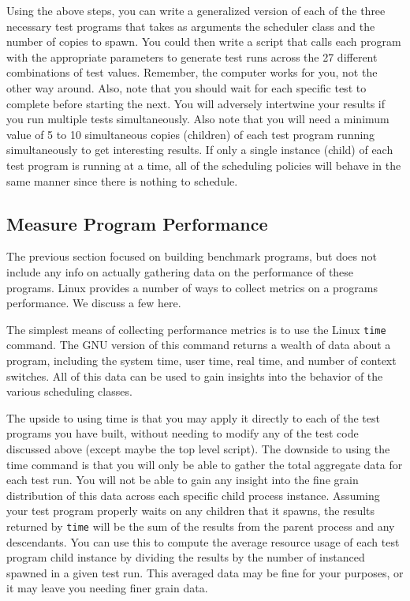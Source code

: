 \documentclass[12pt]{article}
\begin{document}
Using the above steps, you can write a generalized version of each
of the three necessary test programs that takes as arguments the
scheduler class and
the number of copies to spawn.
You could then write a script that calls each program with the
appropriate parameters to generate test runs
across the 27 different combinations of test values. Remember, the
computer works for you, not the other way around. Also, note that you
should wait for each specific test to complete before
starting the next. You will adversely intertwine your results if you
run multiple tests simultaneously. Also note that you will
need a minimum value of 5 to 10 simultaneous copies (children) of each test
program running simultaneously to get interesting results. If only a
single instance (child) of each test program is running at a time, all of the
scheduling policies will behave in the same manner since there is
nothing to schedule.

\subsection{Measure Program Performance}

The previous section focused on building benchmark programs, but does
not include any info on actually gathering data on the performance of
these programs. Linux provides a number of ways to collect metrics on
a programs performance. We discuss a few here.

The simplest means of collecting performance metrics is to use the Linux
\texttt{time} command. The GNU version of this command returns a
wealth of data about a program, including the system time, user time,
real time, and number of context switches. All of this data can be
used to gain insights into the behavior of the various scheduling
classes.

The upside to using time is that you may apply it directly to each of
the test programs you have built, without needing to modify any of the
test code discussed above (except maybe the top level script).
The downside to using the time command is that you will only be able to gather
the total aggregate data for each test run. You will not be able to gain any
insight into the fine grain distribution of this data across each
specific child process instance. Assuming your test program properly waits
on any children that it spawns, the results returned by \texttt{time}
will be the sum of the results from the parent process and any
descendants. You can use this to compute the average resource usage of
each test program child instance by dividing the results by the number
of instanced spawned in a given test run.
This averaged data may be fine for your
purposes, or it may leave you needing finer grain data.
\end{document}
